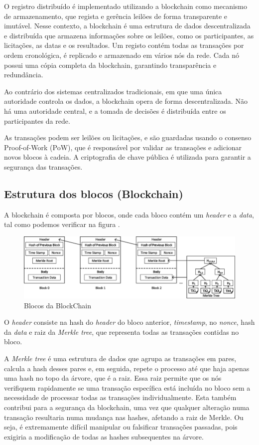\documentclass[conference]{IEEEtran}
\begin{document}
    O registro distribuído é implementado utilizando a blockchain como mecanismo de armazenamento, que regista e gerência leilões de forma transparente e imutável.
    Nesse contexto, a blockchain é uma estrutura de dados descentralizada e distribuída que armazena informações sobre os leilões, como os participantes, as licitações, as datas e os resultados. Um registo contém todas as transações por ordem cronológica, é replicado e armazenado em vários nós da rede. Cada nó possui uma cópia completa da blockchain, garantindo transparência e redundância.

    Ao contrário dos sistemas centralizados tradicionais, em que uma única autoridade controla os dados, a blockchain opera de forma descentralizada. Não há uma autoridade central, e a tomada de decisões é distribuída entre os participantes da rede.

    As transações podem ser leilões ou licitações, e são guardadas usando o consenso Proof-of-Work (PoW), que é responsável por validar as transações e adicionar novos blocos à cadeia. A criptografia de chave pública é utilizada para garantir a segurança das transações.

    \subsection{Estrutura dos blocos (Blockchain)}
    A blockchain é composta por blocos, onde cada bloco contém um \textit{header} e a \textit{data}, tal como podemos verificar na figura \cite{2}.
    \begin{figure}[H]
        \centering
        \includegraphics[scale=0.3]{images/block-blockchain.png}
        \caption{Blocos da BlockChain \cite{2}}
        \label{fig:Blocos da BlockChain}
    \end{figure}

    O \textit{header} consiste na hash do \textit{header} do bloco anterior, \textit{timestamp}, no \textit{nonce}, hash da \textit{data} e raiz da \textit{Merkle tree}, que representa todas as transações contidas no bloco.

    A \textit{Merkle tree} é uma estrutura de dados que agrupa as transações em pares, calcula a hash desses pares e, em seguida, repete o processo até que haja apenas uma hash no topo da árvore, que é a raiz. Essa raiz permite que os nós verifiquem rapidamente se uma transação específica está incluída no bloco sem a necessidade de processar todas as transações individualmente.
    Esta também contribui para a segurança da blockchain, uma vez que qualquer alteração numa transação resultaria numa mudança nas hashes, afetando a raiz de Merkle. Ou seja, é extremamente difícil manipular ou falsificar transações passadas, pois exigiria a modificação de todas as hashes subsequentes na árvore.
\end{document}
